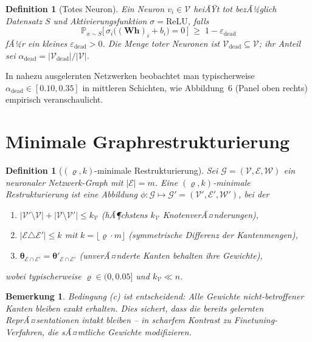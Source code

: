 ﻿\documentclass[12pt, a4paper, openany]{report}
\newtheorem{definition}[theorem]{Definition}
\newtheorem{remark}[theorem]{Bemerkung}
\newcommand{\Prob}{\mathbb{P}}
\newcommand{\calG}{\mathcal{G}}
\newcommand{\calV}{\mathcal{V}}
\newcommand{\calE}{\mathcal{E}}
\newcommand{\calW}{\mathcal{W}}
\newcommand{\eps}{\varepsilon}
\begin{document}
\begin{definition}[Totes Neuron]
\label{def:dead}
Ein Neuron $v_i \in \calV$ heiÃŸt \emph{tot} bezÃ¼glich Datensatz $S$ und
Aktivierungsfunktion $\sigma = \mathrm{ReLU}$, falls
\[
  \Prob_{x \sim S}\!\bigl[\,\sigma_i\bigl((\bm{W}\bm{h})_i + b_i\bigr) = 0\,\bigr]
  \;\geq\; 1 - \eps_{\mathrm{dead}}
\]
fÃ¼r ein kleines $\eps_{\mathrm{dead}} > 0$.  Die Menge toter Neuronen ist
$\calV_{\mathrm{dead}} \subseteq \calV$; ihr Anteil sei
$\alpha_{\mathrm{dead}} = |\calV_{\mathrm{dead}}|/|\calV|$.
\end{definition}

In nahezu ausgelernten Netzwerken beobachtet man typischerweise
$\alpha_{\mathrm{dead}} \in [0.10, 0.35]$ in mittleren Schichten, wie
Abbildung~6 (Panel oben rechts) empirisch veranschaulicht.

\section{Minimale Graphrestrukturierung}

\begin{definition}[$(\varrho, k)$-minimale Restrukturierung]
\label{def:restr}
Sei $\calG = (\calV, \calE, \calW)$ ein neuronaler Netzwerk-Graph mit
$|\calE| = m$.  Eine \emph{$(\varrho, k)$-minimale Restrukturierung} ist
eine Abbildung $\phi : \calG \mapsto \calG' = (\calV', \calE', \calW')$, bei der
\begin{enumerate}[label=(\alph*)]
  \item $|\calV' \setminus \calV| + |\calV \setminus \calV'| \leq k_{\calV}$
        \quad (hÃ¶chstens $k_{\calV}$ KnotenverÃ¤nderungen),
  \item $|\calE \triangle \calE'| \leq k$ mit $k = \lfloor \varrho \cdot m \rfloor$
        \quad (symmetrische Differenz der Kantenmengen),
  \item $\bm{\theta}_{\calE \cap \calE'} = \bm{\theta}'_{\calE \cap \calE'}$
        \quad (unverÃ¤nderte Kanten behalten ihre Gewichte),
\end{enumerate}
wobei typischerweise $\varrho \in (0, 0.05]$ und $k_{\calV} \ll n$.
\end{definition}

\begin{remark}
Bedingung (c) ist entscheidend: Alle Gewichte nicht-betroffener Kanten bleiben
exakt erhalten.  Dies sichert, dass die bereits gelernten ReprÃ¤sentationen
intakt bleiben -- in scharfem Kontrast zu Finetuning-Verfahren, die sÃ¤mtliche
Gewichte modifizieren.
\end{remark}
\end{document}
